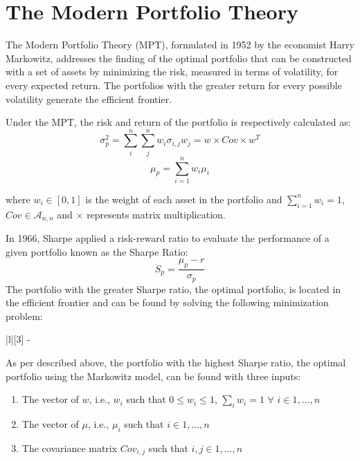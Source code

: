 \documentclass{article}
\newcommand\mat[1]{\mathcal{#1}}
\begin{document}
\section{The Modern Portfolio Theory}
The Modern Portfolio Theory (MPT), formulated in 1952 by the economist Harry Markowitz, addresses the finding of the optimal portfolio that can be constructed with a set of assets by minimizing the risk, measured in terms of volatility, for every expected return. The portfolios with the greater return for every possible volatility generate the efficient frontier.

Under the MPT, the risk and return of the portfolio is respectively calculated as:
\begin{equation}
    \sigma_{p}^{2} = \sum_{i}^{n}\sum_{j}^{n}{w_{i}\sigma_{i,j}w_{j}} = w \times Cov \times w^{T}
\end{equation}
\begin{equation}
    \mu_{p} = \sum_{i=1}^{n}{w_{i} \mu_{i}}
\end{equation}

where $w_{i} \in [0,1]$ is the weight of each asset in the portfolio and $\sum_{i = 1}^{n}{w_{i}} = 1$, $Cov \in \mat{A}_{n,n}$ and $\times$ represents matrix multiplication.



In 1966, Sharpe applied a risk-reward ratio to evaluate the performance of a given portfolio known as the Sharpe Ratio:
\begin{equation}
    S_{p} = \frac{\mu_{p} - r}{\sigma_{p}}
\end{equation}
The portfolio with the greater Sharpe ratio, the optimal portfolio, is located in the efficient frontier and can be found by solving the following minimization problem:

\begin{mini!}|l|[3]
{}{-}
{}{}
\end{mini!}

As per described above, the portfolio with the highest Sharpe ratio, the optimal portfolio using the Markowitz model, can be found with three inputs:
\begin{enumerate}[label=(\textbf{\alph*})]
    \item The vector of $w$, i.e., $w_{i}$ such that $ 0\leq w_i \leq 1$, $\sum_{i}{w_i}=1$ $\forall$ $i \in {1,...,n}$ 
    \item The vector of $\mu$, i.e., $\mu_{i}$ such that $i \in {1,...,n}$
    \item The covariance matrix $Cov_{i,j}$ such that $i,j \in {1,...,n}$ 
\end{enumerate}
\end{document}
